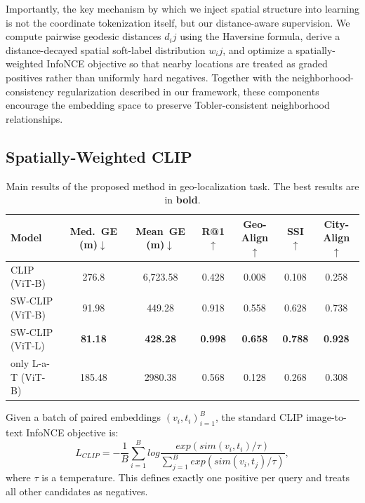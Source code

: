 \documentclass{isprs}
\begin{document}
Importantly, the key mechanism by which we inject spatial structure into learning is not the coordinate tokenization itself, but our distance-aware supervision. We compute pairwise geodesic distances $d_ij$ using the Haversine formula, derive a distance-decayed spatial soft-label distribution $w_ij$, and optimize a spatially-weighted InfoNCE objective so that nearby locations are treated as graded positives rather than uniformly hard negatives. Together with the neighborhood-consistency regularization described in our framework, these components encourage the embedding space to preserve Tobler-consistent neighborhood relationships.

\subsection{Spatially-Weighted CLIP}

\begin{table}[t]
\centering
\small
\setlength{\tabcolsep}{6pt}
\renewcommand{\arraystretch}{1.15}
\caption{Main results of the proposed method in geo-localization task. The best results are in \textbf{bold}.}
\begin{tabular}{lcccccc}
\toprule
\textbf{Model} & \textbf{Med.\ GE (m)$\downarrow$} & \textbf{Mean\ GE (m)$\downarrow$} & \textbf{R@1$\uparrow$} & \textbf{Geo-Align$\uparrow$} & \textbf{SSI$\uparrow$} & \textbf{City-Align$\uparrow$} \\
\midrule
CLIP (ViT-B) & 276.8 & 6,723.58 & 0.428 & 0.008 & 0.108 & 0.258 \\
\midrule
SW-CLIP (ViT-B) & 91.98 & 449.28 & 0.918 & 0.558 & 0.628 & 0.738 \\
SW-CLIP (ViT-L) & \textbf{81.18} & \textbf{428.28} & \textbf{0.998} & \textbf{0.658} & \textbf{0.788} & \textbf{0.928} \\
\midrule
only L-a-T (ViT-B) & 185.48 & 2980.38 & 0.568 & 0.128 & 0.268 & 0.308 \\
\bottomrule
\end{tabular}
\label{tab:main_results}
\end{table}

Given a batch of paired embeddings ${(v_i, t_i)}^{B}_{i=1}$, the standard CLIP image-to-text InfoNCE objective is:
\begin{equation}
    L_{CLIP} = -\frac{1}{B}\sum^{B}_{i=1}log\frac{exp(sim(v_i, t_i)/\tau)}{\sum^{B}_{j=1}exp(sim(v_i, t_j)/\tau)},
\end{equation}
where $\tau$ is a temperature. This defines exactly one positive per query and treats all other candidates as negatives.
\end{document}
